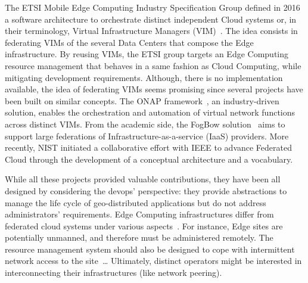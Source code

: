 


%
The ETSI Mobile Edge Computing Industry Specification Group
defined in 2016 a software architecture to orchestrate distinct
independent Cloud systems or, in their terminology, Virtual
Infrastructure Managers (VIM)~\cite{7574435}.
%
The idea consists in federating VIMs of the several Data Centers that
compose the Edge infrastructure.  By reusing VIMs, the ETSI group targets an Edge
Computing resource management that behaves in a same fashion as Cloud
Computing, while mitigating development requirements.
%
Although, there is no implementation available, the idea of federating
VIMs seems promising since several projects have been built on similar
concepts. The ONAP framework~\cite{onap}, an industry-driven solution,
enables the orchestration and automation of virtual network functions
across distinct VIMs. From the academic side, the FogBow
solution~\cite{brasileiro2016fogbow} aims to support large federations
of Infrastructure-as-a-service (IaaS) providers. More recently, NIST
initiated a collaborative effort with IEEE to advance Federated
Cloud through the development of a conceptual architecture and a
vocabulary.

While all these projects provided valuable contributions, they have
been all designed by considering the devops' perspective: they provide
abstractions to manage the life cycle of geo-distributed applications
but do not address administrators' requirements.
%
Edge Computing infrastructures differ from federated cloud systems
under various aspects~\cite{openstack:whitepaper}.  For instance, Edge
sites are potentially unmanned, and therefore must be administered
remotely. The resource management system should also be designed to
cope with intermittent network access to the site~\ldots
%
Ultimately, distinct operators might be interested in interconnecting their infrastructures (like network peering).
%

